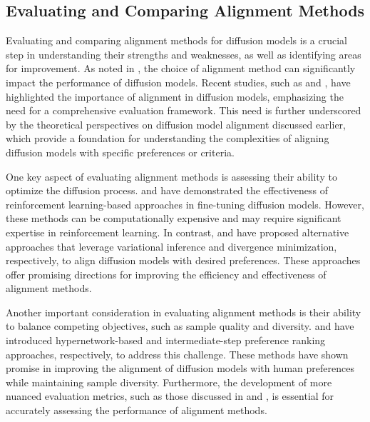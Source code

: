 \documentclass[11pt,a4paper]{article}
\begin{document}
\subsection{Evaluating and Comparing Alignment Methods}


Evaluating and comparing alignment methods for diffusion models is a crucial step in understanding their strengths and weaknesses, as well as identifying areas for improvement. As noted in \cite{doi:10.1145/3626235}, the choice of alignment method can significantly impact the performance of diffusion models. Recent studies, such as \cite{doi:10.1109/tkde.2024.3361474} and \cite{arxiv:2502.06805}, have highlighted the importance of alignment in diffusion models, emphasizing the need for a comprehensive evaluation framework. This need is further underscored by the theoretical perspectives on diffusion model alignment discussed earlier, which provide a foundation for understanding the complexities of aligning diffusion models with specific preferences or criteria.

One key aspect of evaluating alignment methods is assessing their ability to optimize the diffusion process. \cite{arxiv:2305.13301} and \cite{arxiv:2402.16359} have demonstrated the effectiveness of reinforcement learning-based approaches in fine-tuning diffusion models. However, these methods can be computationally expensive and may require significant expertise in reinforcement learning. In contrast, \cite{arxiv:2510.00502} and \cite{arxiv:2507.07510} have proposed alternative approaches that leverage variational inference and divergence minimization, respectively, to align diffusion models with desired preferences. These approaches offer promising directions for improving the efficiency and effectiveness of alignment methods.

Another important consideration in evaluating alignment methods is their ability to balance competing objectives, such as sample quality and diversity. \cite{arxiv:2601.15968} and \cite{arxiv:2502.01667} have introduced hypernetwork-based and intermediate-step preference ranking approaches, respectively, to address this challenge. These methods have shown promise in improving the alignment of diffusion models with human preferences while maintaining sample diversity. Furthermore, the development of more nuanced evaluation metrics, such as those discussed in \cite{arxiv:2410.00083} and \cite{arxiv:2303.07576}, is essential for accurately assessing the performance of alignment methods.
\end{document}
